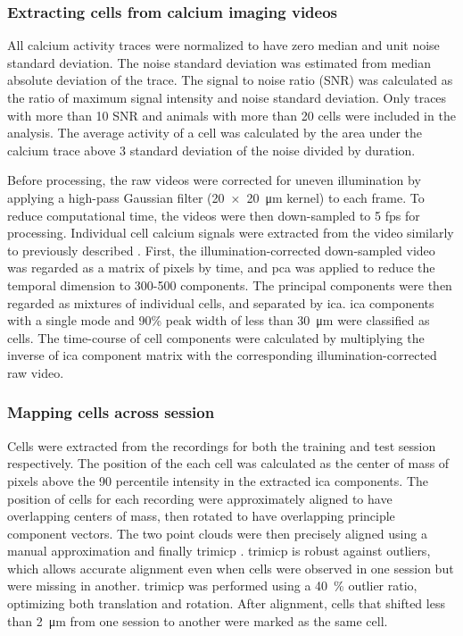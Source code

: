 \subsubsection{Extracting cells from calcium imaging videos}

All calcium activity traces were normalized to have zero median and unit noise standard deviation. The noise standard deviation was estimated from median absolute deviation of the trace. The signal to noise ratio (SNR) was calculated as the ratio of maximum signal intensity and noise standard deviation. Only traces with more than 10 SNR and animals with more than 20 cells were included in the analysis. The average activity of a cell was calculated by the area under the calcium trace above 3 standard deviation of the noise divided by duration.

Before processing, the raw videos were corrected for uneven illumination by applying a high-pass Gaussian filter (\SI{20 x 20}{\um} kernel) to each frame. To reduce computational time, the videos were then down-sampled to 5 fps for processing. Individual cell calcium signals were extracted from the video similarly to previously described \citep{mukamel09}. First, the illumination-corrected down-sampled video was regarded as a matrix of pixels by time, and \gls{pca} was applied to reduce the temporal dimension to 300-500 components. The principal components were then regarded as mixtures of individual cells, and separated by \gls{ica}. \Gls{ica} components with a single mode and 90\% peak width of less than \SI{30}{\um} were classified as cells. The time-course of cell components were calculated by multiplying the inverse of \gls{ica} component matrix with the corresponding illumination-corrected raw video.

\subsubsection{Mapping cells across session}
Cells were extracted from the recordings for both the training and test session respectively. The position of the each cell was calculated as the center of mass of pixels above the \num{90} percentile intensity in the extracted \gls{ica} components. The position of cells for each recording were approximately aligned to have overlapping centers of mass, then rotated to have overlapping principle component vectors. The two point clouds were then precisely aligned using a manual approximation and finally \gls{trimicp} \citep{chetverikov02}. \Gls{trimicp} is robust against outliers, which allows accurate alignment even when cells were observed in one session but were missing in another. \Gls{trimicp} was performed using a \SI{40}{\percent} outlier ratio, optimizing both translation and rotation. After alignment, cells that shifted less than \SI{2}{\um} from one session to another were marked as the same cell. 


